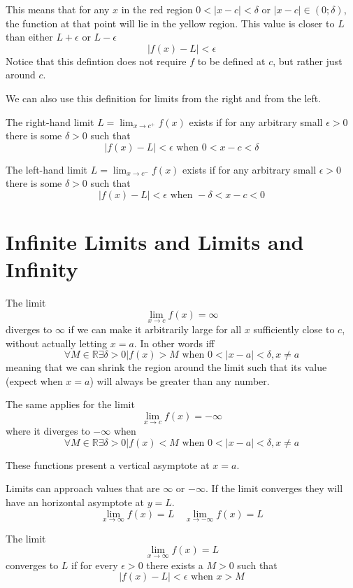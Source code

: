 \documentclass[a4paper]{article}
\begin{document}
This means that for any \(x\) in the red region \(0<|x-c|<\delta\text{ or }|x-c|\in (0; \delta)\),
the function at that point will lie in the yellow region.
This value is closer to \(L\) than either \(L + \epsilon\) or \(L - \epsilon\)
\[
    |f(x) - L| < \epsilon
\]
Notice that this defintion does not require \(f\) to be defined at \(c\), but rather just around \(c\).

We can also use this definition for limits from the right and from the left.

The right-hand limit \(L=\lim_{x\to c^{+}}f(x)\) exists if for any arbitrary small \(\epsilon > 0\)
there is some \(\delta > 0\) such that
\[
    |f(x)-L|<\epsilon \text{ when } 0 < x-c < \delta
\]

The left-hand limit \(L=\lim_{x\to c^{-}}f(x)\) exists if for any arbitrary small \(\epsilon > 0\)
there is some \(\delta > 0\) such that
\[
    |f(x)-L|<\epsilon \text{ when } -\delta < x-c < 0
\]

\pagebreak

\section{Infinite Limits and Limits and Infinity}

The limit
\[
    \lim_{x\to c}f(x) = \infty
\]
diverges to \(\infty\) if we can make it arbitrarily large for all \(x\)
sufficiently close to \(c\), without actually letting \(x=a\).
In other words iff
\[
    \forall M \in \mathbb{R} \exists \delta > 0 | f(x) > M \text{ when } 0<|x-a|<\delta, x \neq a
\]
meaning that we can shrink the region around the limit such that its value (expect when \(x=a\))
will always be greater than any number.

The same applies for the limit
\[
    \lim_{x\to c}f(x) = -\infty
\]
where it diverges to \(-\infty\) when
\[
    \forall M \in \mathbb{R} \exists \delta > 0 | f(x) < M \text{ when } 0<|x-a|<\delta, x \neq a
\]

These functions present a vertical asymptote at \(x=a\).

Limits can approach values that are \(\infty\) or \(-\infty\).
If the limit converges they will have an horizontal asymptote at \(y=L\).
\[
    \lim_{x \to \infty} f(x) = L
    \quad
    \lim_{x \to -\infty} f(x) = L
\]

The limit
\[
    \lim_{x \to \infty} f(x)=L
\]
converges to \(L\) if for every \(\epsilon > 0\) there exists a \(M > 0\) such that
\[
    |f(x)-L| < \epsilon \text{ when } x > M
\]
\end{document}

